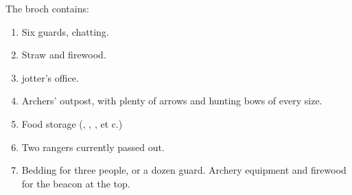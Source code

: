 \begin{multicols}{2}
The \gls{broch} contains:

\begin{enumerate}
  \item
  Six \glspl{guard}, chatting.
  \label{cinderOne}
  \item
  Straw and firewood.
  \label{cinderTwo}
  \item
  \Gls{jotter}'s office.
  \label{cinderThree}
  \item
  Archers' outpost, with plenty of arrows and hunting bows of every size.
  \label{cinderFour}
  \item
  Food storage (\rations, \rations, \rations, et c.)
  \label{cinderFiveSide}
  \item
  Two \glspl{ranger} currently passed out.
  \label{cinderFive}
  \item
  Bedding for three people, or a dozen \gls{guard}.
  Archery equipment and firewood for the beacon at the top.
  \label{cinderSix}
\end{enumerate}

\end{multicols}
